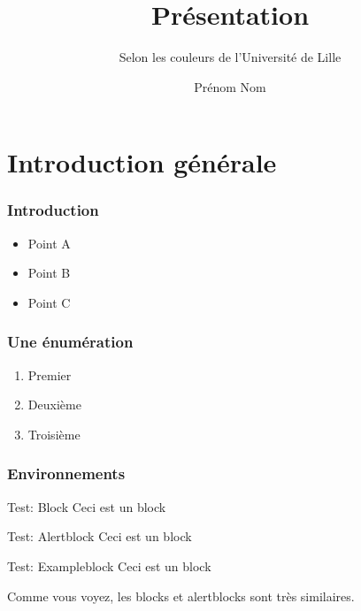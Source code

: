 \documentclass[svgnames,12pt,aspectratio=149]{beamer}
\author{Prénom Nom}
\title{Présentation}
\subtitle{Selon les couleurs de l'Université de Lille}
\begin{document}
\begin{frame}[plain]
  \titlepage
\end{frame}

\section{Introduction générale}
\begin{frame}
  \frametitle{Introduction}

  \begin{itemize}
  \item Point A
  \item Point B
  \item Point C
  \end{itemize}
\end{frame}

\begin{frame}
  \frametitle{Une énumération}

  \begin{enumerate}
  \item Premier
  \item Deuxième
  \item Troisième
  \end{enumerate}
\end{frame}

\begin{frame}
  \frametitle{Environnements}
  \begin{block}{Test: Block}
    Ceci est un block
  \end{block}


  \begin{alertblock}{Test: Alertblock}
    Ceci est un block
  \end{alertblock}

  \begin{exampleblock}{Test: Exampleblock}
    Ceci est un block
  \end{exampleblock}

  Comme vous voyez, les \alert{blocks} et \alert{alertblocks} sont très similaires.
  
\end{frame}
\end{document}
